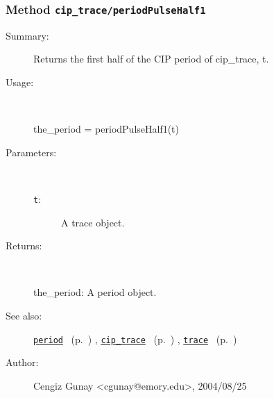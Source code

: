 \subsubsection[Method \texttt{periodPulseHalf1}]{Method \texttt{cip\_trace/periodPulseHalf1}}%
%
\label{ref_cip_trace__periodPulseHalf1}%
\hypertarget{ref_cip_trace__periodPulseHalf1}{}%
\begin{description}
\item[Summary:]Returns the first half of the CIP period of cip\_trace, t. 
%
\item[Usage:]~%
\begin{lyxcode}%
the\_period = periodPulseHalf1(t)
%
\end{lyxcode}%
%
%
\item[Parameters:]~
\begin{description}%
\item[\texttt{t}:]
 A trace object.
\end{description}%
%
\item[Returns:]~

	the\_period: A period object.
%
%
\item[See also:]%
\hyperlink{ref_period}{\texttt{period}}%
\ (p.~\pageref{ref_period})%
%
, \hyperlink{ref_cip_trace}{\texttt{cip\_trace}}%
\ (p.~\pageref{ref_cip_trace})%
%
, \hyperlink{ref_trace}{\texttt{trace}}%
\ (p.~\pageref{ref_trace})%
%
%
\item[Author:]%
Cengiz Gunay <cgunay@emory.edu>, 2004/08/25%
\end{description}
\methodline%
